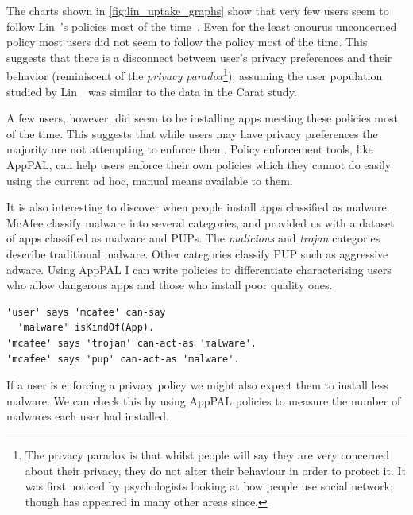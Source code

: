 \documentclass[thesis.tex]{subfiles}
\begin{document}
The charts shown in \autoref{fig:lin_uptake_graphs} show that very few users seem to follow Lin~\etal's policies most of the time~\cite{hallett_apppal_2016}.  Even for the least onourus unconcerned policy most users did not seem to follow the policy most of the time.
This suggests that there is a disconnect between user's privacy preferences and their behavior (reminiscent of the \emph{privacy paradox}\footnote{The privacy paradox is that whilst people will say they are very concerned about their privacy, they do not alter their behaviour in order to protect it.  It was first noticed by psychologists looking at how people use social network; though has appeared in many other areas since.}); assuming the user population studied by Lin~\etal~was similar to the data in the Carat study.

A few users, however, did seem to be installing apps meeting these policies most of the time.
This suggests that while users may have privacy preferences the majority are not attempting to enforce them.
Policy enforcement tools, like AppPAL, can help users enforce their own policies which they cannot do easily using the current ad hoc, manual means available to them.

It is also interesting to discover when people install apps classified as malware.
McAfee classify malware into several categories, and provided us with a dataset of apps classified as malware and \acp{PUP}.
The \emph{malicious} and \emph{trojan} categories describe traditional malware.
Other categories classify \ac{PUP} such as aggressive adware.
Using AppPAL I can write policies to differentiate characterising users who allow dangerous apps and those who install poor quality ones.
\begin{lstlisting}
'user' says 'mcafee' can-say
  'malware' isKindOf(App).
'mcafee' says 'trojan' can-act-as 'malware'.
'mcafee' says 'pup' can-act-as 'malware'.
\end{lstlisting}
If a user is enforcing a privacy policy we might also expect them to install less malware.
We can check this by using AppPAL policies to measure the number of malwares each user had installed.
\end{document}
